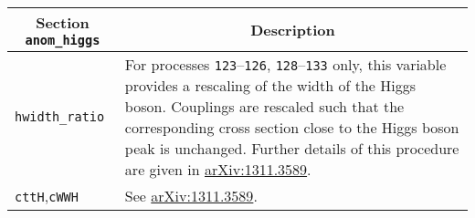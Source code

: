 	\begin{longtable}{p{1.5cm}p{12cm}}
		\hline
		\multicolumn{1}{c}{{\textbf{Section} \texttt{anom\_higgs}}} & \multicolumn{1}{c}{{\textbf{Description}}} \\ 
		\hline
		{\tt hwidth\_ratio} & For processes {\tt 123}--{\tt 126}, {\tt 128}--{\tt 133} only,
		this variable provides a rescaling of the width of the Higgs boson.  Couplings are rescaled such that the
		corresponding cross section close to the Higgs boson peak is unchanged.  Further details of this procedure are 
		given in \href{https://arxiv.org/abs/1311.3589}{arXiv:1311.3589}. \\
		\texttt{cttH},\texttt{cWWH} & See \href{https://arxiv.org/abs/1311.3589}{arXiv:1311.3589}. \\
		\hline
	\end{longtable}
